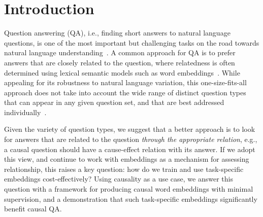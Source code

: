
\section{Introduction}
\label{sec:introduction}

Question answering (QA), i.e., finding short answers to natural language questions, is one of the most important but challenging 
tasks on the road towards natural language understanding~\cite{Etzioni:11}. 
A common approach for QA is to prefer answers that are closely related to the question, where relatedness is often determined using lexical semantic models such as word embeddings~\cite{yih13,jansen14,fried2015higher}. 
While appealing for its robustness to natural language variation, this one-size-fits-all approach does not take into account the wide range of distinct question types that can appear in any given question set, and that are best addressed individually~\cite{chu2004ibm,ferrucci2010building,clark2013study}.  

Given the variety of question types, we suggest that a better approach is to look for answers %
that are related to the question \emph{through the appropriate relation}, e.g., a causal question should have a cause-effect relation with its answer.
If we adopt this view, and continue to work with embeddings as a mechanism for assessing relationship,
this raises a key question: how do we train and use task-specific embeddings cost-effectively? 
Using causality as a use case, we answer this question with a framework for producing causal word embeddings with minimal supervision, and a demonstration that such task-specific embeddings significantly benefit causal QA. 


